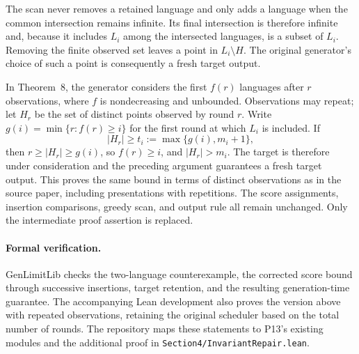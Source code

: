 The scan never removes a retained language and only adds a language
when the common intersection remains infinite. Its final
intersection is therefore infinite and, because it includes $L_i$
among the intersected languages, is a subset of $L_i$. Removing
the finite observed set leaves a point in $L_i\setminus H$.
The original generator's choice of such a point is consequently a
fresh target output.

In Theorem~8, the generator considers the first $f(r)$ languages
after $r$ observations, where $f$ is nondecreasing and unbounded.
Observations may repeat; let $H_r$ be the set of distinct points
observed by round $r$. Write $g(i)=\min\{r:f(r)\ge i\}$ for
the first round at which $L_i$ is included. If
\[
 |H_r|\ge t_i:=\max\{g(i),m_i+1\},
\]
then $r\ge |H_r|\ge g(i)$, so $f(r)\ge i$, and $|H_r|>m_i$.
The target is therefore under consideration and the preceding
argument guarantees a fresh target output. This proves the same
bound in terms of distinct observations as in the source paper,
including presentations with repetitions.
The score assignments, insertion comparisons, greedy
scan, and output rule all remain unchanged. Only the intermediate
proof assertion is replaced.

\paragraph{Formal verification.}
GenLimitLib checks the two-language counterexample, the corrected
score bound through successive insertions, target retention, and the
resulting generation-time guarantee. The accompanying Lean development
also proves the version above with repeated observations, retaining the
original scheduler based on the total number of rounds. The repository
maps these statements to P13's existing modules and the additional proof
in \nolinkurl{Section4/InvariantRepair.lean}.
